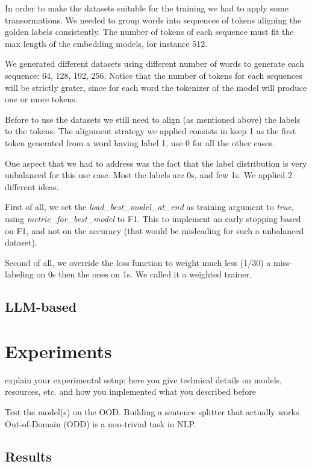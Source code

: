 \documentclass[11pt]{article}
\begin{document}
In order to make the datasets suitable for the training we had to apply some transormations. 
We needed to group words into sequences of tokens aligning the golden labels consistently.
The number of tokens of each sequence must fit the max length of the embedding models,
for instance 512.

We generated different datasets using different number of words to generate each sequence: 
64, 128, 192, 256. Notice that the number of tokens for each sequences will be strictly grater,
since for each word the tokenizer of the model will produce one or more tokens.

Before to use the datasets we still need to align (as mentioned above)  the labels to the tokens.
The alignment strategy we applied consists in keep 1 as the first token generated from a word
having label 1, use 0 for all the other cases.

One aspect that we had to address was the fact that the label distribution is very unbalanced
for this use case. Most the labels are 0s, and few 1s. We applied 2 different ideas.

First of all, we set the \emph{load\_best\_model\_at\_end} as training argument to \emph{true},
using \emph{metric\_for\_best\_model} to F1. This to implement an early stopping based on F1,
and not on the accuracy (that would be misleading for such a unbalanced dataset).

Second of all,  we override the loss function to weight much less (1/30) a miss-labeling on 0s then
the ones on 1s. We called it a weighted trainer. 

\subsection{LLM-based}

\section{Experiments}

explain your experimental setup; here you give technical details on
models, resources, etc. and how you implemented what you described before

Test the model(s) on the OOD.
Building a sentence splitter that actually works Out-of-Domain (ODD) is a non-trivial task in NLP.

\subsection{Results}
\end{document}
